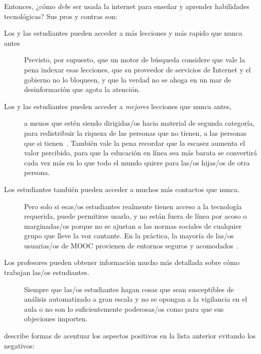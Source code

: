 Entonces, ¿cómo \emph{debe} ser usada la internet para enseñar y aprender habilidades tecnológicas?
Sus pros y contras son:

\begin{description}

\item[Los y las estudiantes pueden acceder a más lecciones y más rapido que nunca antes]
  Previsto,
  por supuesto,
  que un motor de búsqueda considere que vale la pena indexar esas lecciones,
  que su proveedor de servicios de Internet y el gobierno no lo bloqueen,
  y que la verdad no se ahoga en un mar de desinformación que agota la atención.

\item[Los y las estudiantes pueden acceder a \emph{mejores} lecciones que nunca antes,]
  a menos que estén siendo dirigidas/os hacia material de segunda categoría,
  para redistribuir la riqueza de las personas que no tienen, a las personas que si tienen~\cite{McMi2017}.
  También vale la pena recordar que la escasez aumenta el valor percibido,
  para que la educación en línea sea más barata
  se convertirá cada vez más en lo que todo el mundo quiere para las/os hijas/os de otra persona.

\item[Los estudiantes también pueden acceder a muchos más contactos que nunca.]
  Pero solo si esas/os estudiantes realmente tienen acceso a la tecnología requerida,
  puede permitirse usarlo,
  y no están fuera de línea por acoso o marginadas/os
  porque no se ajustan a las normas sociales de cualquier grupo que lleve la voz cantante.
  En la práctica,
  la mayoría de las/os usuarias/os de MOOC provienen de entornos seguros y acomodados~\cite{Hans2015}.

\item[Los profesores pueden obtener información mucho más detallada sobre cómo trabajan las/os estudiantes.]
  Siempre que las/os estudiantes hagan cosas que sean susceptibles de análisis automatizado a gran escala
  y no se opongan a la vigilancia en el aula
  o no son lo suficientemente poderosas/os como para que sus objeciones importen.

\end{description}

\cite{Marg2015,Mill2016a,Nils2017} describe formas de acentuar los aspectos positivos en la lista anterior
evitando los negativos:

